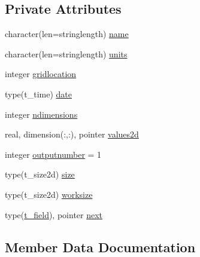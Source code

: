 \subsection*{Private Attributes}
\begin{DoxyCompactItemize}
\item 
character(len=stringlength) \mbox{\hyperlink{structmodulealadinformat_1_1t__field_a25ed753dab802265ca2be2a611a4dc1d}{name}}
\item 
character(len=stringlength) \mbox{\hyperlink{structmodulealadinformat_1_1t__field_a9e72cef9cd585f3118aed54379cad77e}{units}}
\item 
integer \mbox{\hyperlink{structmodulealadinformat_1_1t__field_afac4b1fbc03cd04a7f4e08646c7855bf}{gridlocation}}
\item 
type(t\+\_\+time) \mbox{\hyperlink{structmodulealadinformat_1_1t__field_a21d235b78fa7e5557f890b65937ced36}{date}}
\item 
integer \mbox{\hyperlink{structmodulealadinformat_1_1t__field_ac95fdba60a4048141a3de10bdd65eac6}{ndimensions}}
\item 
real, dimension(\+:,\+:), pointer \mbox{\hyperlink{structmodulealadinformat_1_1t__field_a80939e3247154b84147233556c553b4c}{values2d}}
\item 
integer \mbox{\hyperlink{structmodulealadinformat_1_1t__field_a39b0ca1ffa243e5b81e4bfcb6884e37a}{outputnumber}} = 1
\item 
type(t\+\_\+size2d) \mbox{\hyperlink{structmodulealadinformat_1_1t__field_abee46bd55e33c196b0f31ee8fbe27207}{size}}
\item 
type(t\+\_\+size2d) \mbox{\hyperlink{structmodulealadinformat_1_1t__field_a5020e210dfe08481923211ffcb9f8f63}{worksize}}
\item 
type(\mbox{\hyperlink{structmodulealadinformat_1_1t__field}{t\+\_\+field}}), pointer \mbox{\hyperlink{structmodulealadinformat_1_1t__field_a66345021adcd2791237d8975ca889995}{next}}
\end{DoxyCompactItemize}


\subsection{Member Data Documentation}
\mbox{\label{structmodulealadinformat_1_1t__field_a21d235b78fa7e5557f890b65937ced36}} 
